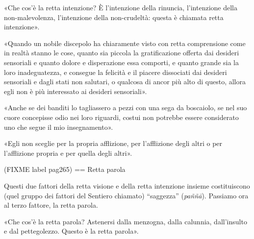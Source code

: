  «Che cos’è la retta intenzione? È l’intenzione della
rinuncia, l’intenzione della non-malevolenza, l’intenzione della
non-crudeltà: questa è chiamata retta intenzione».




«Quando un nobile discepolo ha chiaramente visto con retta comprensione
come in realtà stanno le cose, quanto sia piccola la gratificazione
offerta dai desideri sensoriali e quanto dolore e disperazione essa
comporti, e quanto grande sia la loro inadeguatezza, e consegue la
felicità e il piacere dissociati dai desideri sensoriali e dagli stati
non salutari, o qualcosa di ancor più alto di questo, allora egli non è
più interessato ai desideri sensoriali».




«Anche se dei banditi lo tagliassero a pezzi con una sega da boscaiolo,
se nel suo cuore concepisse odio nei loro riguardi, costui non potrebbe
essere considerato uno che segue il mio insegnamento».




«Egli non sceglie per la propria afflizione, per l’afflizione degli
altri o per l’afflizione propria e per quella degli altri».




(FIXME label pag265)
== Retta parola


 Questi due fattori della retta visione e della retta
intenzione insieme costituiscono (quel gruppo dei fattori del Sentiero
chiamato) “saggezza” (\emph{paññā}). Passiamo ora al terzo fattore, la retta
parola.


 «Che cos’è la retta parola? Astenersi dalla menzogna, dalla
calunnia, dall’insulto e dal pettegolezzo. Questo è la retta parola».




